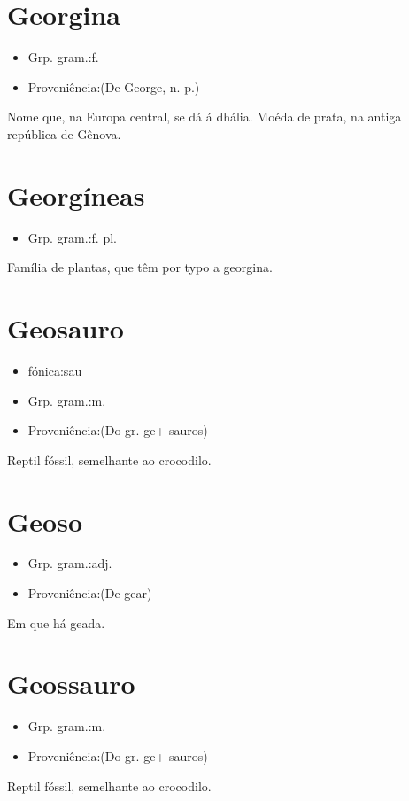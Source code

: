 \section{Georgina}
\begin{itemize}
\item {Grp. gram.:f.}
\end{itemize}
\begin{itemize}
\item {Proveniência:(De \textunderscore George\textunderscore , n. p.)}
\end{itemize}
Nome que, na Europa central, se dá á dhália.
Moéda de prata, na antiga república de Gênova.
\section{Georgíneas}
\begin{itemize}
\item {Grp. gram.:f. pl.}
\end{itemize}
Família de plantas, que têm por typo a georgina.
\section{Geosauro}
\begin{itemize}
\item {fónica:sau}
\end{itemize}
\begin{itemize}
\item {Grp. gram.:m.}
\end{itemize}
\begin{itemize}
\item {Proveniência:(Do gr. \textunderscore ge\textunderscore  + \textunderscore sauros\textunderscore )}
\end{itemize}
Reptil fóssil, semelhante ao crocodilo.
\section{Geoso}
\begin{itemize}
\item {Grp. gram.:adj.}
\end{itemize}
\begin{itemize}
\item {Proveniência:(De \textunderscore gear\textunderscore )}
\end{itemize}
Em que há geada.
\section{Geossauro}
\begin{itemize}
\item {Grp. gram.:m.}
\end{itemize}
\begin{itemize}
\item {Proveniência:(Do gr. \textunderscore ge\textunderscore  + \textunderscore sauros\textunderscore )}
\end{itemize}
Reptil fóssil, semelhante ao crocodilo.
